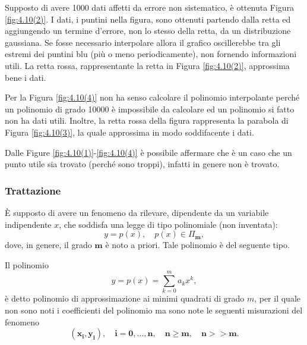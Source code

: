 Supposto di avere 1000 dati affetti da errore non sistematico, è ottenuta Figura \ref{fig:4.10(2)}. I dati, i puntini nella figura, sono ottenuti partendo dalla retta ed aggiungendo un termine d'errore, non lo stesso della retta, da un distribuzione gaussiana. Se fosse necessario interpolare allora il grafico oscillerebbe tra gli estremi dei puntini blu (più o meno periodicamente), non fornendo informazioni utili. La retta rossa, rappresentante la retta in Figura \ref{fig:4.10(2)}, approssima bene i dati.

Per la Figura \ref{fig:4.10(4)} non ha senso calcolare il polinomio interpolante perché un polinomio di grado 10000 è impossibile da calcolare ed un polinomio si fatto non ha dati utili. Inoltre, la retta rossa della figura rappresenta la parabola di Figura \ref{fig:4.10(3)}, la quale approssima in modo soddifacente i dati.

Dalle Figure \ref{fig:4.10(1)}-\ref{fig:4.10(4)} è possibile affermare che è un caso che un punto utile sia trovato (perché sono troppi), infatti in genere non è trovato. 

\subsubsection{Trattazione}
È supposto di avere un fenomeno da rilevare, dipendente da un variabile indipendente $x$, che soddisfa una legge di tipo polinomiale (non inventata):
\begin{equation*}
    y=p(x),\quad p(x)\in\Pi_{\boldsymbol{m}},
\end{equation*}
dove, in genere, il grado $\boldsymbol m$ è noto a priori. Tale polinomio è del seguente tipo.

\begin{definition}
	Il polinomio
	\begin{equation}\label{eq:polinomio_minimi_quadrati}
		y = p(x)=\sum_{k=0}^{m}a_kx^k,
	\end{equation}
	è detto polinomio di approssimazione ai minimi quadrati di grado $m$, per il quale non sono noti i coefficienti del polinomio ma sono note le seguenti misurazioni del fenomeno
	\begin{equation}\label{eq:misurazioni_fenomeno_minimo_quadrato}
		\boldsymbol{(x_i,y_i),\quad i=0,\hdots,n,\quad n\geq m,\quad n}\boldsymbol{>>}\boldsymbol{m}.
	\end{equation}
\end{definition}

